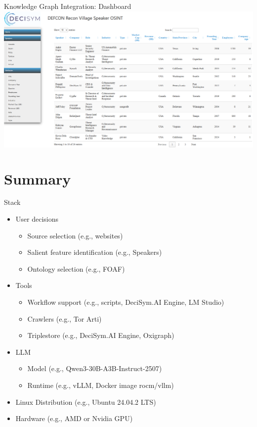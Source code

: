 \documentclass[pdf,aspectratio=169]{beamer}
\begin{document}
\begin{frame}{Knowledge Graph Integration: Dashboard}
  \centering
  \includegraphics[height=0.75\textheight]{automaton_snapshot_2025-08-07.png}
\end{frame}

\section{Summary}

\begin{frame}{Stack}
  \begin{itemize}
  \item User decisions
    \begin{itemize}
    \item Source selection (e.g., websites)
    \item Salient feature identification (e.g., Speakers)
    \item Ontology selection (e.g., FOAF)
    \end{itemize}
  \item Tools
    \begin{itemize}
    \item Workflow support (e.g., scripts, DeciSym.AI Engine, LM Studio)
    \item Crawlers (e.g., Tor Arti)
    \item Triplestore (e.g., DeciSym.AI Engine, Oxigraph)
    \end{itemize}
  \item LLM
    \begin{itemize}
    \item Model (e.g., Qwen3-30B-A3B-Instruct-2507)
    \item Runtime (e.g., vLLM, Docker image rocm/vllm)
    \end{itemize}
  \item Linux Distribution (e.g., Ubuntu 24.04.2 LTS)
  \item Hardware (e.g., AMD or Nvidia GPU)
  \end{itemize}
\end{frame}
\end{document}
